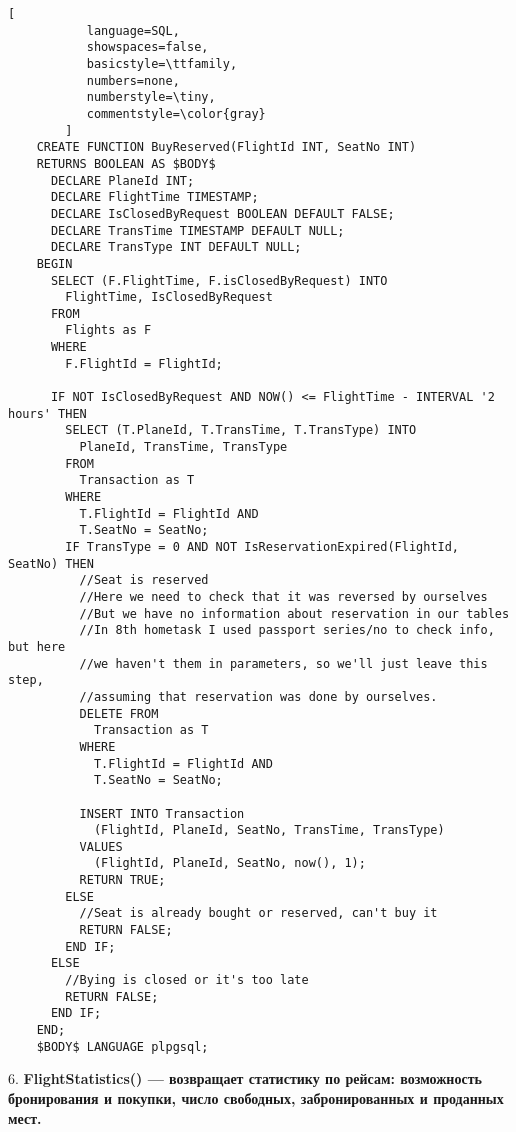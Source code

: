 \documentclass[11pt,a4paper,oneside]{article}
\begin{document}
\begin{lstlisting}[
           language=SQL,
           showspaces=false,
           basicstyle=\ttfamily,
           numbers=none,
           numberstyle=\tiny,
           commentstyle=\color{gray}
        ]
    CREATE FUNCTION BuyReserved(FlightId INT, SeatNo INT)
    RETURNS BOOLEAN AS $BODY$
      DECLARE PlaneId INT;
      DECLARE FlightTime TIMESTAMP;
      DECLARE IsClosedByRequest BOOLEAN DEFAULT FALSE;
      DECLARE TransTime TIMESTAMP DEFAULT NULL;
      DECLARE TransType INT DEFAULT NULL;
    BEGIN
      SELECT (F.FlightTime, F.isClosedByRequest) INTO
        FlightTime, IsClosedByRequest
      FROM
        Flights as F
      WHERE
        F.FlightId = FlightId;

      IF NOT IsClosedByRequest AND NOW() <= FlightTime - INTERVAL '2 hours' THEN
        SELECT (T.PlaneId, T.TransTime, T.TransType) INTO
          PlaneId, TransTime, TransType
        FROM
          Transaction as T
        WHERE
          T.FlightId = FlightId AND
          T.SeatNo = SeatNo;
        IF TransType = 0 AND NOT IsReservationExpired(FlightId, SeatNo) THEN
          //Seat is reserved
          //Here we need to check that it was reversed by ourselves
          //But we have no information about reservation in our tables
          //In 8th hometask I used passport series/no to check info, but here
          //we haven't them in parameters, so we'll just leave this step,
          //assuming that reservation was done by ourselves.
          DELETE FROM
            Transaction as T
          WHERE
            T.FlightId = FlightId AND
            T.SeatNo = SeatNo;

          INSERT INTO Transaction
            (FlightId, PlaneId, SeatNo, TransTime, TransType)
          VALUES
            (FlightId, PlaneId, SeatNo, now(), 1);
          RETURN TRUE;
        ELSE
          //Seat is already bought or reserved, can't buy it
          RETURN FALSE;
        END IF;
      ELSE
        //Bying is closed or it's too late
        RETURN FALSE;
      END IF;
    END;
    $BODY$ LANGUAGE plpgsql;
\end{lstlisting}

6. \textbf{FlightStatistics() — возвращает статистику по рейсам: возможность бронирования и покупки, число свободных, забронированных и проданных мест.}
\end{document}
